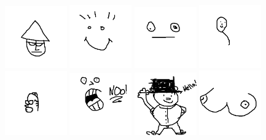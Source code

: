 \includegraphics[width=0.2\textwidth]{art/Safari_38.png}
\includegraphics[width=0.2\textwidth]{art/Safari_39.png}
\includegraphics[width=0.2\textwidth]{art/Safari_4.png}
\includegraphics[width=0.2\textwidth]{art/Safari_40.png}
\includegraphics[width=0.2\textwidth]{art/Safari_41.png}
\includegraphics[width=0.2\textwidth]{art/Safari_42.png}
\includegraphics[width=0.2\textwidth]{art/Safari_43.png}
\includegraphics[width=0.2\textwidth]{art/Safari_44.png}
